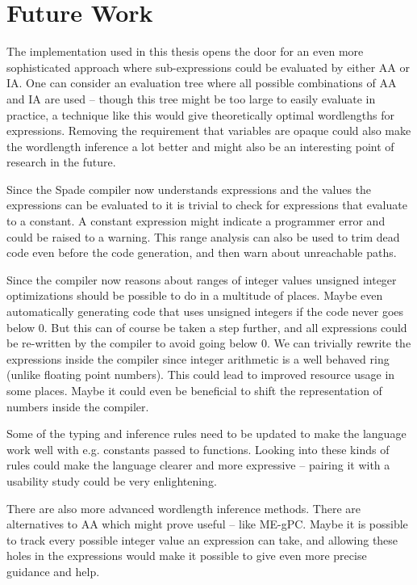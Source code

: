 \chapter{Future Work}
The implementation used in this thesis opens the door for an even more sophisticated approach where sub-expressions could be evaluated by either AA or IA. One can consider an evaluation tree where all possible combinations of AA and IA are used -- though this tree might be too large to easily evaluate in practice, a technique like this would give theoretically optimal wordlengths for expressions. Removing the requirement that variables are opaque could also make the wordlength inference a lot better and might also be an interesting point of research in the future.

Since the Spade compiler now understands expressions and the values the expressions can be evaluated to it is trivial to check for expressions that evaluate to a constant. A constant expression might indicate a programmer error and could be raised to a warning. This range analysis can also be used to trim dead code even before the code generation, and then warn about unreachable paths.

Since the compiler now reasons about ranges of integer values unsigned integer optimizations should be possible to do in a multitude of places. Maybe even automatically generating code that uses unsigned integers if the code never goes below 0. But this can of course be taken a step further, and all expressions could be re-written by the compiler to avoid going below 0. We can trivially rewrite the expressions inside the compiler since integer arithmetic is a well behaved ring (unlike floating point numbers). This could lead to improved resource usage in some places. Maybe it could even be beneficial to shift the representation of numbers inside the compiler.

Some of the typing and inference rules need to be updated to make the language work well with e.g. constants passed to functions. Looking into these kinds of rules could make the language clearer and more expressive -- pairing it with a usability study could be very enlightening.

There are also more advanced wordlength inference methods. There are alternatives to AA which might prove useful -- like ME-gPC. Maybe it is possible to track every possible integer value an expression can take, and allowing these holes in the expressions would make it possible to give even more precise guidance and help.

